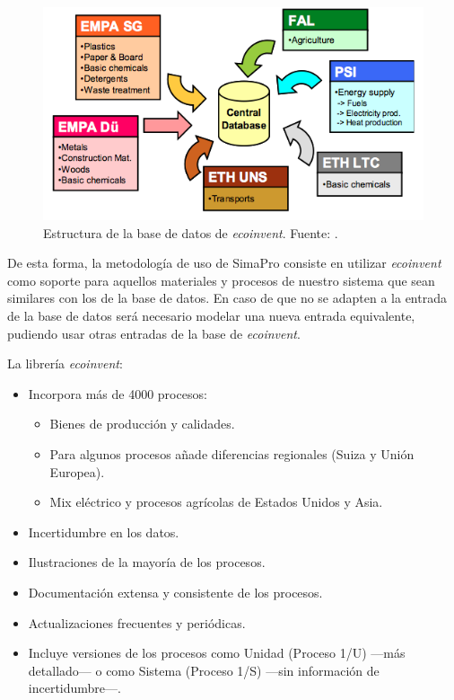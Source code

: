 \begin{figure}[!htb]
\centering
\includegraphics[width=13cm]{bbddecoinvent.png}
\caption[Estructura de la base de datos de \textit{ecoinvent}.]{Estructura de la base de datos de \textit{ecoinvent}. Fuente: \protect\cite{mgoedkoop2}.}
\label{fig:bbddecoinvent}
\end{figure}

De esta forma, la metodología de uso de SimaPro consiste en utilizar \textit{ecoinvent} como soporte para aquellos materiales y procesos de nuestro sistema que sean similares con los de la base de datos. En caso de que no se adapten a la entrada de la base de datos será necesario modelar una nueva entrada equivalente, pudiendo usar otras entradas de la base de \textit{ecoinvent}.

La librería \textit{ecoinvent}:
\begin{itemize}
  \item Incorpora más de 4000 procesos:
  \begin{itemize}
    \item Bienes de producción y calidades.
    \item Para algunos procesos añade diferencias regionales (Suiza y Unión Europea).
    \item Mix eléctrico y procesos agrícolas de Estados Unidos y Asia.
  \end{itemize}
  \item Incertidumbre en los datos.
  \item Ilustraciones de la mayoría de los procesos.
  \item Documentación extensa y consistente de los procesos.
  \item Actualizaciones frecuentes y periódicas.
  \item Incluye versiones de los procesos como Unidad (Proceso 1/U) —más detallado— o como Sistema (Proceso 1/S) —sin información de incertidumbre—.
\end{itemize}

